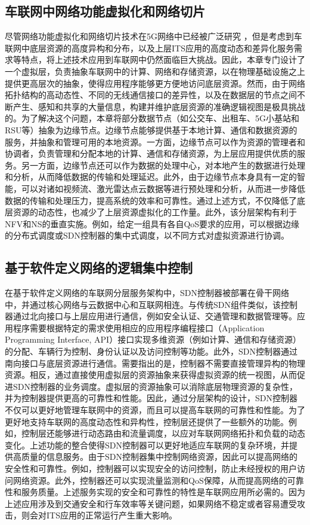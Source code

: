 \subsection{车联网中网络功能虚拟化和网络切片}

尽管网络功能虚拟化和网络切片技术在5G网络中已经被广泛研究 \cite{zhu2021wang}，但是考虑到车联网中底层资源的高度异构和分布，以及上层ITS应用的高度动态和差异化服务需求等特点，将上述技术应用到车联网中仍然面临巨大挑战。因此，本章专门设计了一个虚拟层，负责抽象车联网中的计算、网络和存储资源，以在物理基础设施之上提供更高层次的抽象，使得应用程序能够更方便地访问底层资源。然而，由于网络拓扑结构的高动态性、不同的无线通信接口的差异性，以及在数据层的节点之间不断产生、感知和共享的大量信息，构建并维护底层资源的准确逻辑视图是极具挑战的。为了解决这个问题，本章将部分数据节点（如公交车、出租车、5G小基站和RSU等）抽象为边缘节点。边缘节点能够提供基于本地计算、通信和数据资源的服务，并抽象和管理可用的本地资源。一方面，边缘节点可以作为资源的管理者和协调者，负责管理和分配本地的计算、通信和存储资源，为上层应用提供优质的服务。另一方面，边缘节点还可以作为数据的处理中心，对本地产生的数据进行处理和分析，从而降低数据的传输和处理延迟。此外，由于边缘节点本身具有一定的智能，可以对诸如视频流、激光雷达点云数据等进行预处理和分析，从而进一步降低数据的传输和处理压力，提高系统的效率和可靠性。通过上述方式，不仅降低了底层资源的动态性，也减少了上层资源虚拟化的工作量。此外，该分层架构有利于NFV和NS的垂直实施。例如，给定一组具有各自QoS要求的应用，可以根据边缘的分布式调度或SDN控制器的集中式调度，以不同方式对虚拟资源进行协调。

\subsection{基于软件定义网络的逻辑集中控制}

在基于软件定义网络的车联网分层服务架构中，SDN控制器被部署在骨干网络中，并通过核心网络与云数据中心和互联网相连。与传统SDN组件类似，该控制器通过北向接口与上层应用进行通信，例如安全认证、交通管理和数据管理等。应用程序需要根据特定的需求使用相应的应用程序编程接口（Application Programming Interface, API）接口实现多维资源（例如计算、通信和存储资源）的分配、车辆行为控制、身份认证以及访问控制等功能。此外，SDN控制器通过南向接口与底层资源进行通信。需要指出的是，控制器不需要直接管理异构的物理资源。相反，通过直接使用虚拟层的资源抽象来获得虚拟资源的统一视图，从而促进SDN控制器的业务调度。虚拟层的资源抽象可以消除底层物理资源的复杂性，并为控制器提供更高的可靠性和性能。因此，通过分层架构的设计，SDN控制器不仅可以更好地管理车联网中的资源，而且可以提高车联网的可靠性和性能。为了更好地支持车联网的高度动态性和异构性，控制层还提供了一些额外的功能。例如，控制层还能够进行动态路由和流量调度，以应对车联网网络拓扑和负载的动态变化。上述功能的整合使得SDN控制器可以更好地适应车联网的复杂环境，并提供高质量的信息服务。由于SDN控制器集中控制网络资源，因此可以提高网络的安全性和可靠性。例如，控制器可以实现安全的访问控制，防止未经授权的用户访问网络资源。此外，控制器还可以实现流量监测和QoS保障，从而提高网络的可靠性和服务质量。上述服务实现的安全和可靠性的特性是车联网应用所必需的。因为上述应用涉及到交通安全和行车效率等关键问题，如果网络不稳定或者容易遭受攻击，则会对ITS应用的正常运行产生重大影响。


